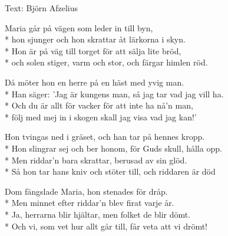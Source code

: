 \begin{SongText}
\begin{SongInfo}
    Text: Björn Afzelius
\end{SongInfo}
\begin{SongVerse}
Maria går på vägen som leder in till byn,\\*%
hon sjunger och hon skrattar åt lärkorna i skyn.\\*%
Hon är på väg till torget för att sälja lite bröd,\\*%
och solen stiger, varm och stor, och färgar himlen röd.
\end{SongVerse}
\begin{SongVerse}
Då möter hon en herre på en häst med yvig man.\\*%
Han säger: 'Jag är kungens man, så jag tar vad jag vill ha.\\*%
Och du är allt för vacker för att inte ha nå'n man,\\*%
följ med mej in i skogen skall jag visa vad jag kan!'
\end{SongVerse}
\begin{SongVerse}
Hon tvingas ned i gräset, och han tar på hennes kropp.\\*%
Hon slingrar sej och ber honom, för Guds skull, hålla opp.\\*%
Men riddar'n bara skrattar, berusad av sin glöd.\\*%
Så hon tar hans kniv och stöter till, och riddaren är död
\end{SongVerse}
\begin{SongVerse}
Dom fängslade Maria, hon stenades för dråp.\\*%
Men minnet efter riddar'n blev firat varje år.\\*%
Ja, herrarna blir hjältar, men folket de blir dömt.\\*%
Och vi, som vet hur allt går till, får veta att vi drömt!
\end{SongVerse}
\end{SongText}
